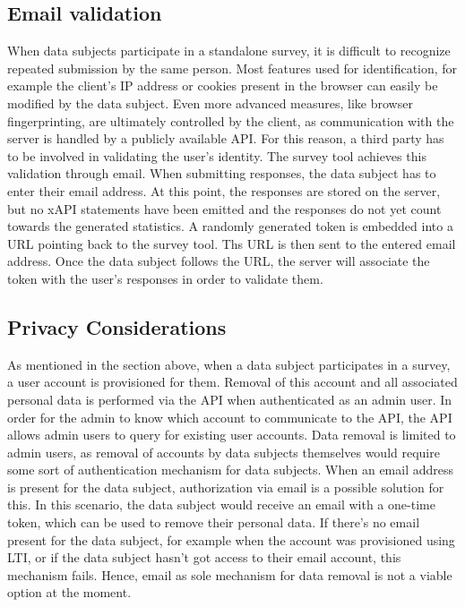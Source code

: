 \documentclass[a4paper,11pt]{article}
\begin{document}
            \subsection{Email validation}
                When data subjects participate in a standalone survey,
                it is difficult to recognize repeated submission by the same
                person. Most features used for identification, for example the client's
                IP address or cookies present in the browser can easily be
                modified by the data subject. Even more
                advanced measures, like browser fingerprinting, are ultimately
                controlled by the client, as communication with the server
                is handled by a publicly available API. For this reason,
                a third party has to be involved in validating the user's identity.
                The survey tool achieves this validation through email.
                When submitting responses, the data subject has to enter their
                email address. At this point, the responses are stored on the server,
                but no xAPI statements have been emitted and the responses do not
                yet count towards the generated statistics. 
                A randomly generated token is embedded into a URL pointing back to the survey tool. 
                Ths URL is then sent to the entered email address. 
                Once the data subject follows the URL, the server will associate the 
                token with the user's responses in order to validate them.

            \subsection{Privacy Considerations}
                As mentioned in the section above, when a data subject participates
                in a survey, a user account is provisioned for them. Removal
                of this account and all associated personal data is performed
                via the API when authenticated as an admin user.
                In order for the admin to know which account to communicate
                to the API, the API allows admin users to query for existing
                user accounts. Data removal is limited to admin users,
                as removal of accounts by data subjects themselves would require
                some sort of authentication mechanism for data subjects.
                When an email address is present for the data subject,
                authorization via email is a possible solution for this.
                In this scenario, the data subject would receive an email
                with a one-time token, which can be used to remove their personal
                data. If there's no email present for the data subject, for example
                when the account was provisioned using LTI, or if the data subject
                hasn't got access to their email account, this mechanism fails.
                Hence, email as sole mechanism for data removal is not a viable
                option at the moment.
                
\end{document}

